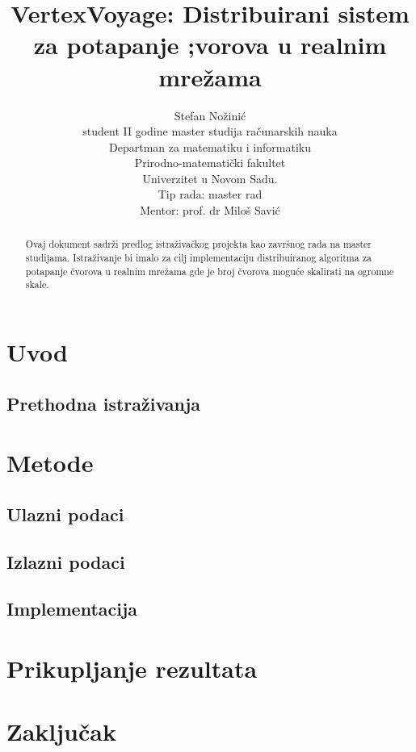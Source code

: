 \documentclass[]{amsart}
\begin{document}
\title{VertexVoyage: Distribuirani sistem za potapanje ;vorova u realnim mrežama}
\author{Stefan Nožinić \\
student II godine master studija računarskih nauka \\
Departman za matematiku i informatiku \\
Prirodno-matematički fakultet \\
Univerzitet u Novom Sadu. \\
Tip rada: master rad \\
Mentor: \MakeLowercase{prof. dr} Miloš Savić
}

\begin{abstract}
    Ovaj dokument sadrži predlog istraživačkog projekta kao završnog rada na master studijama.
    Istraživanje bi imalo za cilj implementaciju distribuiranog algoritma za potapanje čvorova u realnim mrežama gde je broj čvorova moguće skalirati na ogromne skale.     
\end{abstract}


\maketitle
\newpage


\section{Uvod}
\label{sec:introduction}

\cite{grover2016node2vec}


\subsection{Prethodna istraživanja}
\label{sec:prev_work}

\section{Metode}
\label{sec:methods}
\subsection{Ulazni podaci}
\label{sec:input_data}


\subsection{Izlazni podaci}
\label{sec:output_data}



\subsection{Implementacija}
\label{sec:implementation}

\section{Prikupljanje rezultata}
\label{sec:results}




\section{Zaključak}
\label{sec:conclusion}



\end{document}
